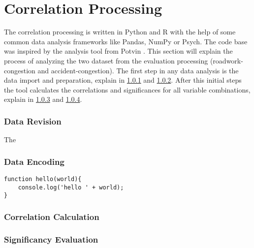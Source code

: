 \section{Correlation Processing}
\label{methodology_correlation_processing}
The correlation processing is written in Python and R with the help of some common data analysis frameworks like Pandas, NumPy or Psych. The code base was inspired by the analysis tool from Potvin \parencite{Potvin2020}. This section will explain the process of analyzing the two dataset from the evaluation processing (roadwork-congestion and accident-congestion). The first step in any data analysis is the data import and preparation, explain in \cref{methodology_correlation_processing_revision} and \cref{methodology_correlation_processing_encoding}. After this initial steps the tool calculates the correlations and significances for all variable combinations, explain in \cref{methodology_correlation_processing_correlation} and \cref{methodology_correlation_processing_significanc}. 

\subsubsection{Data Revision}
\label{methodology_correlation_processing_revision}
The 

\subsubsection{Data Encoding}
\label{methodology_correlation_processing_encoding}

\begin{lstlisting}[style=js, caption={Beispiellisting}, label=lst:sample] 
function hello(world){
    console.log('hello ' + world);
}
\end{lstlisting}


\subsubsection{Correlation Calculation}
\label{methodology_correlation_processing_correlation}

\subsubsection{Significancy Evaluation}
\label{methodology_correlation_processing_significanc}
